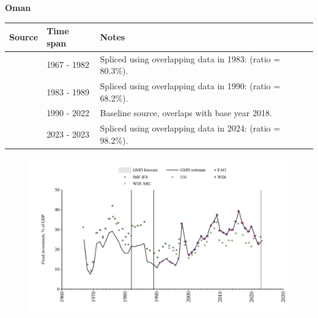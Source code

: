 \documentclass[12pt,a4paper,landscape]{article}
\begin{document}
\begin{adjustbox}{max totalsize={\paperwidth}{\paperheight},center}
\begin{minipage}[t][\textheight][t]{\textwidth}
\vspace*{0.5cm}
{}
\begin{center}
{\Large\bfseries Oman}
\end{center}
\vspace{0.5cm}
\begin{table}[H]
\centering
\small
\begin{tabular}{|l|l|l|}
\hline
\textbf{Source} & \textbf{Time span} & \textbf{Notes} \\
\hline
\rowcolor{white}\cite{WDI}& 1967 - 1982 &Spliced using overlapping data in 1983: (ratio = 80.3\%).\\
\rowcolor{lightgray}\cite{UN}& 1983 - 1989 &Spliced using overlapping data in 1990: (ratio = 68.2\%).\\
\rowcolor{white}\cite{WDI}& 1990 - 2022 &Baseline source, overlaps with base year 2018.\\
\rowcolor{lightgray}\cite{IMF_IFS}& 2023 - 2023 &Spliced using overlapping data in 2024: (ratio = 98.2\%).\\
\hline
\end{tabular}
\end{table}
\begin{figure}[H]
\centering
\includegraphics[width=\textwidth,height=0.6\textheight,keepaspectratio]{graphs/OMN_finv_GDP.pdf}
\end{figure}
\end{minipage}
\end{adjustbox}
\end{document}
